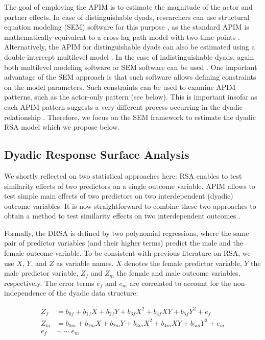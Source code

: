 \documentclass[jou,a4paper,draftfirst]{apa6}
\begin{document}
The goal of employing the APIM is to estimate the magnitude of the actor and partner effects. In case of distinguishable dyads, researchers can use structural equation modeling (SEM) software for this purpose \parencite{kenny_dyadic_2006}, as the standard APIM is mathematically equivalent to a cross-lag path model with two time-points \parencite{NestlerEtAl2015}. 
Alternatively, the APIM for distinguishable dyads can also be estimated using a double-intercept multilevel model \parencite{kenny_dyadic_2006}. In the case of indistinguishable dyads, again both multilevel modeling software or SEM software can be used \parencite[see][]{kenny_dyadic_2006,olsen_structural_2006}. One important advantage of the SEM approach is that such software allows defining constraints on the model parameters. Such constraints can be used to examine APIM patterns, such as the actor-only pattern (see below). This is important insofar as each APIM pattern suggests a very different process occurring in the dyadic relationship \parencite[see][]{KennyLedermann2010}. Therefore, we focus on the SEM framework to estimate the dyadic RSA model which we propose below.


\subsection{Dyadic Response Surface Analysis}

We shortly reflected on two statistical approaches here: RSA enables to test similarity effects of two predictors on a single outcome variable. APIM allows to test simple main effects of two predictors on two interdependent (dyadic) outcome variables. It is now straightforward to combine these two approaches to obtain a method to test similarity effects on two interdependent outcomes \parencite{NestlerEtAl2015}.

Formally, the DRSA is defined by two polynomial regressions, where the same pair of predictor variables (and their higher terms) predict the male and the female outcome variable. To be consistent with previous literature on RSA, we use $X$, $Y$, and $Z$ as variable names. $X$ denotes the female predictor variable, $Y$ the male predictor variable, $Z_f$ and $Z_m$ the female and male outcome variables, respectively. The error terms $e_f$ and $e_m$ are correlated to account for the non-independence of the dyadic data structure:

\begin{equation} 
\label{eq:dyadic}
\begin{split}
Z_f &= b_{0f} + b_{1f} X + b_{2f} Y + b_{3f} X^2 + b_{4f} X Y + b_{5f} Y^2 + e_f\\
Z_m &= b_{0m} + b_{1m} X + b_{2m} Y + b_{3m} X^2 + b_{4m} X Y + b_{5m} Y^2 + e_m\\
e_f &\sim\sim e_m
\end{split}
\end{equation}
\end{document}
